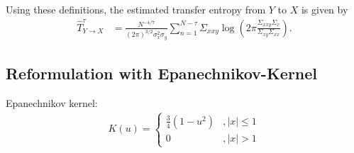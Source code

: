 \documentclass[12pt,a4paper,twoside,english,fleqn,preprint,aps,prb]{revtex4}
\begin{document}
Using these definitions, the estimated transfer entropy from $Y$ to $X$ is
given by \begin{align} \hat{T}_{Y \rightarrow X}^{\tau} &=
\frac{N^{-4/7}}{(2\pi)^{3/2}\sigma_x^2 \sigma_y} \sum_{n=1}^{N-\tau}
\Sigma_{xxy} \log\left(2\pi \frac{\Sigma_{xxy} \Sigma_{x}}{\Sigma_{xy}
\Sigma_{xx}} \right).  \end{align}


\subsection{Reformulation with Epanechnikov-Kernel}
Epanechnikov kernel:
\begin{align}
  K(u) = \begin{cases}
            \frac{3}{4}(1-u^{2}) &, |x| \leq 1\\
                               0 &, |x| > 1
         \end{cases}
\end{align}











\end{document}

